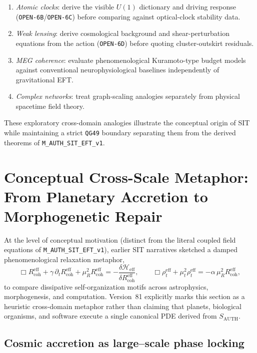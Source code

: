\begin{enumerate}[label=\textbullet,leftmargin=1.8em]
\item \emph{Atomic clocks}: derive the visible $U(1)$ dictionary and driving response (\texttt{OPEN-6B}/\texttt{OPEN-6C}) before comparing against optical-clock stability data.  
\item \emph{Weak lensing}: derive cosmological background and shear-perturbation equations from the action (\texttt{OPEN-6D}) before quoting cluster-outskirt residuals.  
\item \emph{MEG coherence}: evaluate phenomenological Kuramoto-type budget models against conventional neurophysiological baselines independently of gravitational EFT.  
\item \emph{Complex networks}: treat graph-scaling analogies separately from physical spacetime field theory.
\end{enumerate}

These exploratory cross-domain analogies illustrate the conceptual origin of SIT while maintaining a strict \texttt{QG49} boundary separating them from the derived theorems of \texttt{M\_AUTH\_SIT\_EFT\_v1}.

\section{Conceptual Cross-Scale Metaphor: From Planetary Accretion to Morphogenetic Repair}
\label{sec:evolving-configuration}

At the level of conceptual motivation (distinct from the literal coupled field equations of \texttt{M\_AUTH\_SIT\_EFT\_v1}), earlier SIT narratives sketched a damped phenomenological relaxation metaphor,
\[
\Box R_{\text{coh}}^{\mathrm{eff}}+\gamma\,\partial_{t}R_{\text{coh}}^{\mathrm{eff}}+\mu_{R}^{2}R_{\text{coh}}^{\mathrm{eff}}=-\frac{\delta\mathcal{H}_{\mathrm{eff}}}{\delta R_{\text{coh}}^{\mathrm{eff}}},
\qquad
\Box\rho_{t}^{\mathrm{eff}}+\mu_{t}^{2}\rho_{t}^{\mathrm{eff}}=-\alpha\,\mu_{R}^{2}R_{\text{coh}}^{\mathrm{eff}},
\]
to compare dissipative self-organization motifs across astrophysics, morphogenesis, and computation. Version~81 explicitly marks this section as a heuristic cross-domain metaphor rather than claiming that planets, biological organisms, and software execute a single canonical PDE derived from $S_{\mathrm{AUTH}}$.

\subsection*{Cosmic accretion as large--scale phase locking}

